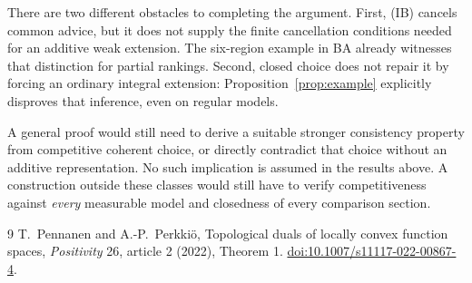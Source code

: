 \documentclass[11pt]{article}
\theoremstyle{remark}\newtheorem{remark}[theorem]{Remark}
\begin{document}
There are two different obstacles to completing the argument.
First, (IB) cancels common advice, but it does not supply the finite
cancellation conditions needed for an additive weak extension. The
six-region example in BA already witnesses that distinction for partial
rankings. Second, closed choice does not repair it by forcing an ordinary
integral extension: Proposition~\ref{prop:example} explicitly disproves
that inference, even on regular models.

A general proof would still need to derive a suitable stronger consistency
property from competitive coherent choice, or directly contradict that
choice without an additive representation. No such implication is assumed
in the results above. A construction outside these classes would still
have to verify competitiveness against \emph{every} measurable model and
closedness of every comparison section.

\begin{thebibliography}{9}
 T.~Pennanen and A.-P.~Perkki\"o,
Topological duals of locally convex function spaces,
\emph{Positivity} 26, article 2 (2022), Theorem 1.
\href{https://doi.org/10.1007/s11117-022-00867-4}{doi:10.1007/s11117-022-00867-4}.
\end{thebibliography}
\end{document}
